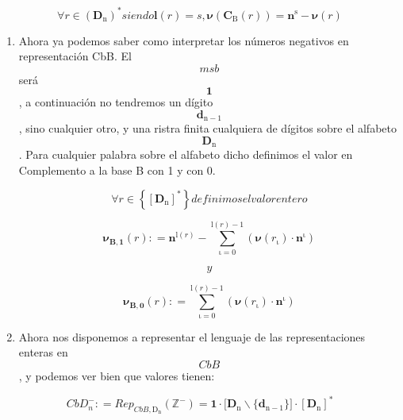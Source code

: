 \begin{enumerate}
\begin{enumerate}
\begin{enumerate}
      \[\forall{\mathit{r} \in \left( \mathbf{D}_{\mathbf{\mathrm{n}}} \right)^{\ast}}\mathit{siendo}\mathbf{l}{{(\mathit{r})} = s},\mathbf{\nu}{{({\mathbf{C}_{\mathbf{\mathrm{Β}}}{(\mathit{r})}})} = {\mathbf{n}^{\mathbf{\mathrm{s}}} - \mathbf{\nu}}}{(\mathit{r})}\]

      \begin{enumerate}
      \def\labelenumiv{\arabic{enumiv}.}
      \setcounter{enumiv}{1}
      \item
        Ahora ya podemos saber como interpretar los números negativos en
        represen\-tación CbB. El \[\mathbf{\mathit{msb}}\]será
        \[\mathbf{1}\], a continuación no tendremos un dígito
        \[\mathbf{d}_{\mathbf{\mathrm{n - 1}}}\], sino cualquier otro, y
        una ristra finita cualquiera de dígitos sobre el alfabeto
        \[\mathbf{D}_{\mathbf{\mathrm{n}}}\]. Para cualquier palabra
        sobre el alfabeto dicho definimos el valor en Complemento a la
        base B con 1 y con 0.

        \[\forall{\mathit{r} \in \left\{ \left\lbrack \mathbf{D}_{\mathbf{\mathrm{n}}} \right\rbrack^{\mathbf{\mathrm{\ast}}} \right\}}\mathit{definimos}\mathit{el}\mathit{valor}\mathit{entero}\]

        \[\mathbf{\nu_{Β,1}}{(\mathit{r})}{: =}{\mathbf{n}^{\mathbf{\mathrm{l}}{(\mathit{r})}} - {\sum\limits_{\mathbf{\mathrm{\iota = 0}}}^{{\mathbf{\mathrm{l}}{(\mathit{r})}} - \mathbf{\mathrm{1}}}{({\mathbf{\nu}{{(\mathit{r}_{\mathbf{\mathrm{\iota}}})} \cdot \mathbf{n}^{\mathbf{\mathrm{\iota}}}}})}}}\]

        \[y\]

        \[\mathbf{\nu_{Β,0}}{(\mathit{r})}{: =}{\sum\limits_{\mathbf{\mathrm{\iota = 0}}}^{{\mathbf{\mathrm{l}}{(\mathit{r})}} - \mathbf{\mathrm{1}}}{({\mathbf{\nu}{{(\mathit{r}_{\mathbf{\mathrm{\iota}}})} \cdot \mathbf{n}^{\mathbf{\mathrm{\iota}}}}})}}\]
      \item
        Ahora nos disponemos a representar el lenguaje de las
        representaciones ente\-ras en \[CbB\], y podemos ver bien que
        valores tienen:
      \end{enumerate}

      \[\mathit{CbD}_{n}^{-}{: =}\mathit{Rep}_{\mathit{CbB},\mathbf{\mathrm{D}}_{\mathbf{\mathrm{n}}}}{(\mathbb{Z}^{\mathbf{\mathrm{-}}})}{=}{{\mathbf{1} \cdot {\lbrack{\mathbf{D}_{\mathbf{\mathrm{n}}} \smallsetminus {\{\mathbf{d}_{\mathbf{\mathrm{n - 1}}}\}}}\rbrack}} \cdot \left\lbrack \mathbf{D}_{\mathbf{\mathrm{n}}} \right\rbrack^{\mathbf{\mathrm{\ast}}}}\]


\end{enumerate}
\end{enumerate}
\end{enumerate}
